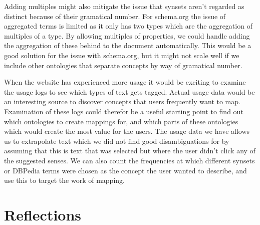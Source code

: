 Adding multiples might also mitigate the issue that synsets aren't regarded as distinct because of their gramatical number.
For schema.org the issue of aggregated terms is limited as it only has two types which are the aggregation of multiples of a type.
By allowing multiples of properties, we could handle adding the aggregation of these behind to the document automatically.
This would be a good solution for the issue with schema.org, but it might not scale well if we include other ontologies
that separate concepts by way of gramatical number.

When the website has experienced more usage it would be exciting to examine the usage logs to see which types of text gets tagged.
Actual usage data would be an interesting source to discover concepts that users frequently want to map.
Examination of these logs could therefor be a useful starting point to find out which ontologies to create mappings for,
and which parts of these ontologies which would create the most value for the users.
The usage data we have allows us to extrapolate text which we did not find good disambiguations for
by assuming that this is text that was selected but where the user didn't click any of the suggested senses.
We can also count the frequencies at which different synsets or DBPedia terms were chosen as the concept the
user wanted to describe, and use this to target the work of mapping.

\section{Reflections}

